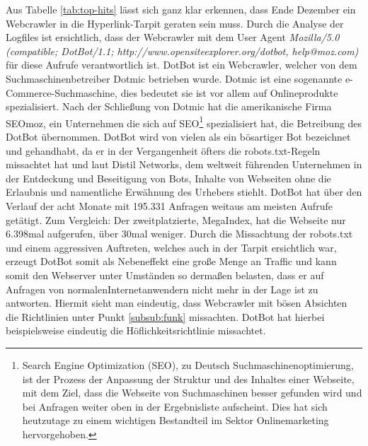 Aus Tabelle \ref{tab:top-hits} lässt sich ganz klar erkennen, dass Ende Dezember ein Webcrawler in die Hyperlink-Tarpit geraten sein muss. Durch die Analyse der Logfiles ist ersichtlich, dass der Webcrawler mit dem User Agent \emph{Mozilla/5.0 (compatible; DotBot/1.1; http://www.opensiteexplorer.org/dotbot, help@moz.com)} für diese Aufrufe verantwortlich ist. DotBot ist ein Webcrawler, welcher von dem Suchmaschinenbetreiber Dotmic betrieben wurde. Dotmic ist eine sogenannte e-Commerce-Suchmaschine, dies bedeutet sie ist vor allem auf Onlineprodukte spezialisiert.\cite{dotmic} Nach der Schließung von Dotmic hat die amerikanische Firma SEOmoz, ein Unternehmen die sich auf SEO\footnote{Search Engine Optimization (SEO), zu Deutsch Suchmaschinenoptimierung, ist der Prozess der Anpassung der Struktur und des Inhaltes einer Webseite, mit dem Ziel, dass die Webseite von Suchmaschinen besser gefunden wird und bei Anfragen weiter oben in der Ergebnisliste aufscheint. Dies hat sich heutzutage zu einem wichtigen Bestandteil im Sektor Onlinemarketing hervorgehoben.} spezialisiert hat, die Betreibung des DotBot übernommen. DotBot wird von vielen als ein bösartiger Bot bezeichnet und gehandhabt, da er in der Vergangenheit öfters die robots.txt-Regeln missachtet hat und laut Distil Networks, dem weltweit führenden Unternehmen in der Entdeckung und Beseitigung von Bots, Inhalte von Webseiten ohne die Erlaubnis und namentliche Erwähnung des Urhebers stiehlt.\cite{dotbot} DotBot hat über den Verlauf der acht Monate mit 195.331 Anfragen weitaus am meisten Aufrufe getätigt. Zum Vergleich: Der \glqq zweitplatzierte\grqq, MegaIndex, hat die Webseite nur 6.398mal aufgerufen, über 30mal weniger. Durch die Missachtung der robots.txt und einem aggressiven Auftreten, welches auch in der Tarpit ersichtlich war, erzeugt DotBot somit als Nebeneffekt eine große Menge an Traffic und kann somit den Webserver unter Umständen so dermaßen belasten, dass er auf Anfragen von \glqq normalen\grqq\space Internetanwendern nicht mehr in der Lage ist zu antworten. Hiermit sieht man eindeutig, dass Webcrawler mit bösen Absichten die Richtlinien unter Punkt \ref{subsub:funk} missachten. DotBot hat hierbei beispielsweise eindeutig die Höflichkeitsrichtlinie missachtet.
